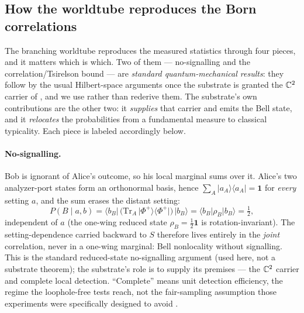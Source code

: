 \subsection{How the worldtube reproduces the Born correlations}
\label{subsec:born-correlations}

The branching worldtube reproduces the measured statistics through four pieces, and it matters
which is which. Two of them --- no-signalling and the correlation/Tsirelson bound --- are
\emph{standard quantum-mechanical results}: they follow by the usual Hilbert-space arguments once
the substrate is granted the $\mathbb{C}^{2}$ carrier of , and we use rather than
rederive them. The substrate's own contributions are the other two: it \emph{supplies} that carrier
and emits the Bell state, and it \emph{relocates} the probabilities from a fundamental measure to
classical typicality. Each piece is labeled accordingly below.

\paragraph{No-signalling.}
Bob is ignorant of Alice's outcome, so his local marginal sums over it. Alice's two analyzer-port
states form an orthonormal basis, hence $\sum_{A}\lvert a_A\rangle\langle a_A\rvert=\mathbf{1}$ for
\emph{every} setting $a$, and the sum erases the distant setting:
\begin{equation}
  P(B\mid a,b)=\langle b_B\rvert\,\bigl(\mathrm{Tr}_A\,\lvert\Phi^+\rangle\langle\Phi^+\rvert\bigr)\,\lvert b_B\rangle
  =\langle b_B\rvert\rho_B\rvert b_B\rangle=\tfrac12 ,
  \label{eq:no-signalling}
\end{equation}
independent of $a$ (the one-wing reduced state $\rho_B=\tfrac12\mathbf{1}$ is rotation-invariant).
The setting-dependence carried backward to $S$ therefore lives entirely in the \emph{joint}
correlation, never in a one-wing marginal: Bell nonlocality without signalling. This is the
standard reduced-state no-signalling argument (used here, not a substrate theorem); the substrate's
role is to supply its premises --- the $\mathbb{C}^{2}$ carrier and complete local detection. ``Complete''
means unit detection efficiency, the regime the loophole-free tests reach, not the fair-sampling
assumption those experiments were specifically designed to avoid \citep{Giustina2015,Shalm2015}.

